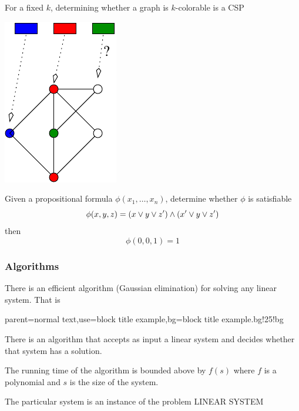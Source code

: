 \documentclass[12pt,xcolor=dvipsnames%
   ]{beamer}
\renewcommand{\.}{\cdot}
\let\emph=\alert
\begin{document}
\begin{frame}
  For a fixed $k$, determining whether a graph is $k$-colorable is a CSP
  \begin{center}
    \includegraphics{k-col}
  \end{center}
\end{frame}


\begin{frame}
Given a propositional formula $\phi(x_1,\dots,x_n)$, determine whether $\phi$ is satisfiable
\bigskip
\begin{equation*}
\phi(x,y,z) = (x\vee y \vee z') \wedge (x'\vee y \vee z')
\end{equation*}
then 
\begin{equation*}
\phi(0,0,1) = 1
\end{equation*}
\end{frame}

\begin{frame}
  \frametitle{Algorithms}
  There is an efficient algorithm (Gaussian elimination) for solving any
  linear system.
  That is

%
{parent=normal text,use=block title example,bg=block title example.bg!25!bg}
  \begin{exampleblock}{}
    There is an algorithm that accepts as \emph{input} a linear system
    and decides whether that system has a solution.

    \smallskip
    The running time of the algorithm is bounded above by $f(s)$ where
    $f$ is a polynomial and $s$ is the size of the system.
  \end{exampleblock}
  \pause

  The particular system is an \emph{instance} of the \emph{problem}
  LINEAR SYSTEM
  
\end{frame}
\end{document}

